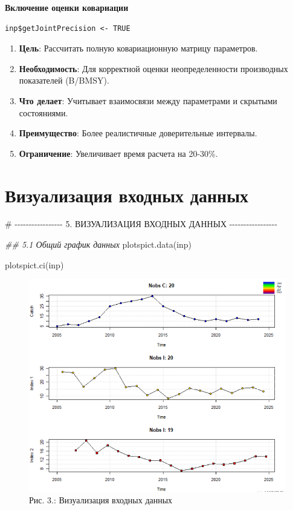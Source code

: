 \documentclass[
  letterpaper,
  DIV=11,
  numbers=noendperiod]{scrreprt}
\newenvironment{Shaded}{\begin{snugshade}}{\end{snugshade}}
\newcommand{\CommentTok}[1]{\textcolor[rgb]{0.37,0.37,0.37}{#1}}
\newcommand{\DocumentationTok}[1]{\textcolor[rgb]{0.37,0.37,0.37}{\textit{#1}}}
\newcommand{\FunctionTok}[1]{\textcolor[rgb]{0.28,0.35,0.67}{#1}}
\newcommand{\NormalTok}[1]{\textcolor[rgb]{0.00,0.23,0.31}{#1}}
\begin{document}
\textbf{Включение оценки ковариации}

\begin{verbatim}
inp$getJointPrecision <- TRUE
\end{verbatim}

\begin{enumerate}
\def\labelenumi{\arabic{enumi}.}
\item
  \textbf{Цель}: Рассчитать полную ковариационную матрицу параметров.
\item
  \textbf{Необходимость}: Для корректной оценки неопределенности
  производных показателей (B/BMSY).
\item
  \textbf{Что делает}: Учитывает взаимосвязи между параметрами и
  скрытыми состояниями.
\item
  \textbf{Преимущество}: Более реалистичные доверительные интервалы.
\item
  \textbf{Ограничение}: Увеличивает время расчета на 20-30\%.
\end{enumerate}

\section{Визуализация входных
данных}\label{ux432ux438ux437ux443ux430ux43bux438ux437ux430ux446ux438ux44f-ux432ux445ux43eux434ux43dux44bux445-ux434ux430ux43dux43dux44bux445}

\begin{Shaded}
\begin{Highlighting}[]
\CommentTok{\# {-}{-}{-}{-}{-}{-}{-}{-}{-}{-}{-}{-}{-}{-}{-}{-}{-} 5. ВИЗУАЛИЗАЦИЯ ВХОДНЫХ ДАННЫХ {-}{-}{-}{-}{-}{-}{-}{-}{-}{-}{-}{-}{-}{-}{-}{-}{-}}

\DocumentationTok{\#\# 5.1 Общий график данных}
\FunctionTok{plotspict.data}\NormalTok{(inp)}

\FunctionTok{plotspict.ci}\NormalTok{(inp)}
\end{Highlighting}
\end{Shaded}

\begin{figure}[H]

{\centering \includegraphics[width=0.6\linewidth,height=\textheight,keepaspectratio]{images/SPICT3.PNG}

}

\caption{Рис. 3.: Визуализация входных данных}

\end{figure}%
\end{document}
